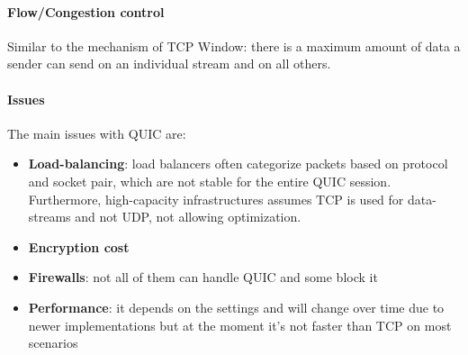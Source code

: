 \paragraph{Flow/Congestion control} Similar to the mechanism of TCP Window: there is a maximum amount of data a sender can send on an individual stream and on all others.

\paragraph{Issues} The main issues with QUIC are:
\begin{itemize}
	\item \textbf{Load-balancing}: load balancers often categorize packets based on protocol and socket pair, which are not stable for the entire QUIC session. Furthermore, high-capacity infrastructures assumes TCP is used for data-streams and not UDP, not allowing optimization.
	\item \textbf{Encryption cost}
	\item \textbf{Firewalls}: not all of them can handle QUIC and some block it
	\item \textbf{Performance}: it depends on the settings and will change over time due to newer implementations but at the moment it's not faster than TCP on most scenarios
\end{itemize}

